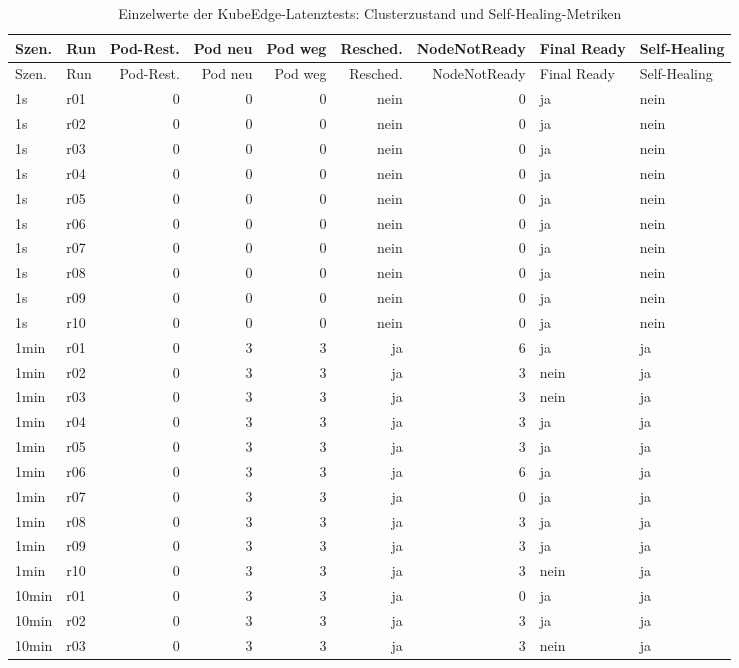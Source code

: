 \begin{longtable}{llrrrrrll}
\caption{Einzelwerte der KubeEdge-Latenztests: Clusterzustand und Self-Healing-Metriken}\label{tab:appendix-kubeedge-latency-cluster}\\
\toprule
Szen. & Run & Pod-Rest. & Pod neu & Pod weg & Resched. & NodeNotReady & Final Ready & Self-Healing \\
\midrule
\endfirsthead
\toprule
Szen. & Run & Pod-Rest. & Pod neu & Pod weg & Resched. & NodeNotReady & Final Ready & Self-Healing \\
\midrule
\endhead
1s & r01 & 0 & 0 & 0 & nein & 0 & ja & nein \\
1s & r02 & 0 & 0 & 0 & nein & 0 & ja & nein \\
1s & r03 & 0 & 0 & 0 & nein & 0 & ja & nein \\
1s & r04 & 0 & 0 & 0 & nein & 0 & ja & nein \\
1s & r05 & 0 & 0 & 0 & nein & 0 & ja & nein \\
1s & r06 & 0 & 0 & 0 & nein & 0 & ja & nein \\
1s & r07 & 0 & 0 & 0 & nein & 0 & ja & nein \\
1s & r08 & 0 & 0 & 0 & nein & 0 & ja & nein \\
1s & r09 & 0 & 0 & 0 & nein & 0 & ja & nein \\
1s & r10 & 0 & 0 & 0 & nein & 0 & ja & nein \\
1min & r01 & 0 & 3 & 3 & ja & 6 & ja & ja \\
1min & r02 & 0 & 3 & 3 & ja & 3 & nein & ja \\
1min & r03 & 0 & 3 & 3 & ja & 3 & nein & ja \\
1min & r04 & 0 & 3 & 3 & ja & 3 & ja & ja \\
1min & r05 & 0 & 3 & 3 & ja & 3 & ja & ja \\
1min & r06 & 0 & 3 & 3 & ja & 6 & ja & ja \\
1min & r07 & 0 & 3 & 3 & ja & 0 & ja & ja \\
1min & r08 & 0 & 3 & 3 & ja & 3 & ja & ja \\
1min & r09 & 0 & 3 & 3 & ja & 3 & ja & ja \\
1min & r10 & 0 & 3 & 3 & ja & 3 & nein & ja \\
10min & r01 & 0 & 3 & 3 & ja & 0 & ja & ja \\
10min & r02 & 0 & 3 & 3 & ja & 3 & ja & ja \\
10min & r03 & 0 & 3 & 3 & ja & 3 & nein & ja \\

\end{longtable}
